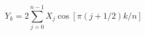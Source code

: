\documentclass[a4paper, 12pt]{article}
\begin{document}
\begin{equation*}
Y_k = 2 \sum\limits_{j=0}^{n-1} X_j \cos\left[ \pi (j+1/2) k / n \right]
\end{equation*}
\end{document}
